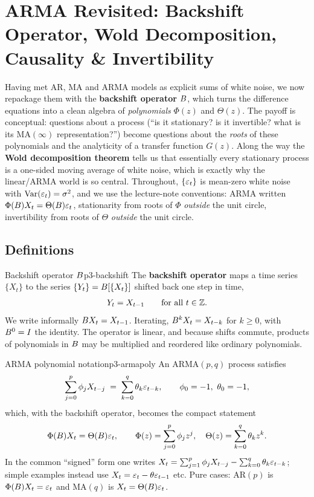 \section{ARMA Revisited: Backshift Operator, Wold Decomposition, Causality \& Invertibility}
\label{sec:armarev}

Having met AR, MA and ARMA models as explicit sums of white noise, we now
repackage them with the \textbf{backshift operator} $B$, which turns the
difference equations into a clean algebra of \emph{polynomials} $\Phi(z)$ and
$\Theta(z)$. The payoff is conceptual: questions about a process
(``is it stationary? is it invertible? what is its $\mathrm{MA}(\infty)$
representation?'') become questions about the \emph{roots} of these
polynomials and the analyticity of a transfer function $G(z)$. Along the way
the \textbf{Wold decomposition theorem} tells us that essentially every
stationary process is a one-sided moving average of white noise, which is
exactly why the linear/ARMA world is so central. Throughout,
$\{\varepsilon_t\}$ is mean-zero white noise with $\operatorname{Var}(\varepsilon_t)=\sigma^2$, and we use
the lecture-note conventions: ARMA written $\Phi(B)X_t=\Theta(B)\varepsilon_t$,
stationarity from roots of $\Phi$ \emph{outside} the unit circle, invertibility
from roots of $\Theta$ \emph{outside} the unit circle.

\subsection{Definitions}

\begin{definition}{Backshift operator $B$}{p3-backshift}
The \textbf{backshift operator} maps a time series $\{X_t\}$ to the series
$\{Y_t\}=B[\{X_t\}]$ shifted back one step in time,
\[
Y_t = X_{t-1}\qquad\text{for all }t\in\mathbb{Z} .
\]
We write informally $B X_t = X_{t-1}$. Iterating, $B^k X_t = X_{t-k}$
for $k\ge0$, with $B^0=I$ the identity. The operator is linear, and
because shifts commute, products of polynomials in $B$ may be multiplied
and reordered like ordinary polynomials.
\end{definition}

\begin{definition}{ARMA polynomial notation}{p3-armapoly}
An $\mathrm{ARMA}(p,q)$ process satisfies
\[
\sum_{j=0}^{p}\phi_j X_{t-j} \;=\; \sum_{k=0}^{q}\theta_k\varepsilon_{t-k},
\qquad \phi_0=-1,\ \theta_0=-1,
\]
which, with the backshift operator, becomes the compact statement
\[
\Phi(B)X_t=\Theta(B)\varepsilon_t,\qquad
\Phi(z)=\sum_{j=0}^{p}\phi_j z^{j},\quad
\Theta(z)=\sum_{k=0}^{q}\theta_k z^{k}.
\]
In the common ``signed'' form one writes
$X_t=\sum_{j=1}^{p}\phi_j X_{t-j}-\sum_{k=0}^{q}\theta_k\varepsilon_{t-k}$;
simple examples instead use $X_t=\varepsilon_t-\theta\varepsilon_{t-1}$ etc. Pure cases:
$\mathrm{AR}(p)$ is $\Phi(B)X_t=\varepsilon_t$ and $\mathrm{MA}(q)$ is
$X_t=\Theta(B)\varepsilon_t$.
\end{definition}

